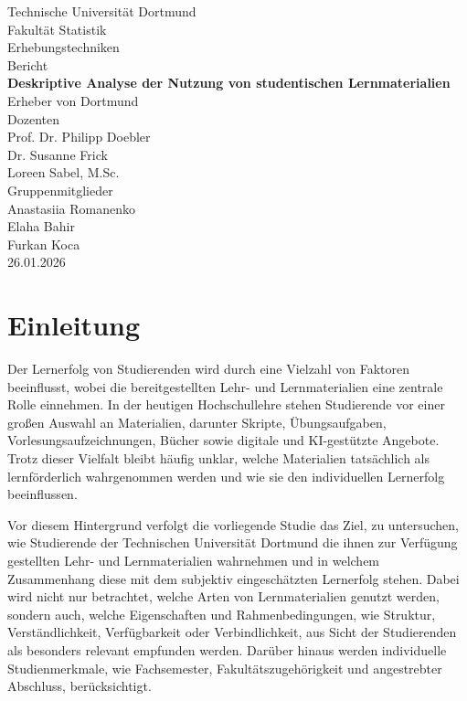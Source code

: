 \documentclass[a4paper,12pt]{article}
\begin{document}
\begin{titlepage}
    \centering
    {\Large Technische Universität Dortmund}\\[0.5cm]
    {\LARGE Fakultät Statistik}\\[1cm]

    \vspace*{5cm}
    {\Large {Erhebungstechniken}}\\[0.5cm]
    {\Large {Bericht}}\\[1.5cm]
    {\Huge \textbf{ Deskriptive Analyse der Nutzung von studentischen Lernmaterialien }}\\[1.4cm]
    {\Large Erheber von Dortmund}\\[3.5cm]
    { Dozenten }\\Prof. Dr. Philipp Doebler\\
    Dr. Susanne Frick\\
    Loreen Sabel, M.Sc.\\
    [0.4cm]
    { Gruppenmitglieder}\\Anastasiia Romanenko \\ Elaha Bahir\\ Furkan Koca\\[1.5cm]
    
    {\large 26.01.2026}
    \vfill
\end{titlepage}

\begingroup
  \flushbottom %
  \tableofcontents
  \newpage
\endgroup

\section{Einleitung}

Der Lernerfolg von Studierenden wird durch eine Vielzahl von Faktoren beeinflusst, wobei die bereitgestellten Lehr- und Lernmaterialien eine zentrale Rolle einnehmen. In der heutigen Hochschullehre stehen Studierende vor einer großen Auswahl an Materialien, darunter Skripte, Übungsaufgaben, Vorlesungsaufzeichnungen, Bücher sowie digitale und KI-gestützte Angebote. Trotz dieser Vielfalt bleibt häufig unklar, welche Materialien tatsächlich als lernförderlich wahrgenommen werden und wie sie den individuellen Lernerfolg beeinflussen.

Vor diesem Hintergrund verfolgt die vorliegende Studie das Ziel, zu untersuchen, wie Studierende der Technischen Universität Dortmund die ihnen zur Verfügung gestellten Lehr- und Lernmaterialien wahrnehmen und in welchem Zusammenhang diese mit dem subjektiv eingeschätzten Lernerfolg stehen. Dabei wird nicht nur betrachtet, welche Arten von Lernmaterialien genutzt werden, sondern auch, welche Eigenschaften und Rahmenbedingungen, wie Struktur, Verständlichkeit, Verfügbarkeit oder Verbindlichkeit, aus Sicht der Studierenden als besonders relevant empfunden werden.
Darüber hinaus werden individuelle Studienmerkmale, wie Fachsemester, Fakultätszugehörigkeit und angestrebter Abschluss, berücksichtigt.
\end{document}
